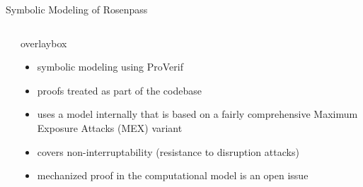\begin{frame}{Symbolic Modeling of Rosenpass}
  \begin{columns}[c]
    \begin{column}{.5\linewidth}
    \end{column}%
    \begin{column}{.5\linewidth}
    \begin{beamercolorbox}[colsep*=1ex,ht=\dimeval{\defaultframetextheight+2pt}]{overlaybox}
      \begin{itemize}
        \item symbolic modeling using ProVerif
        \item proofs treated as part of the codebase
        \item uses a model internally that is based on a fairly comprehensive Maximum Exposure Attacks (MEX) variant
        \item covers non-interruptability (resistance to disruption attacks)
        \item mechanized proof in the computational model is an open issue
      \end{itemize}
  \end{beamercolorbox}
    \end{column}
  \end{columns}
\end{frame}





